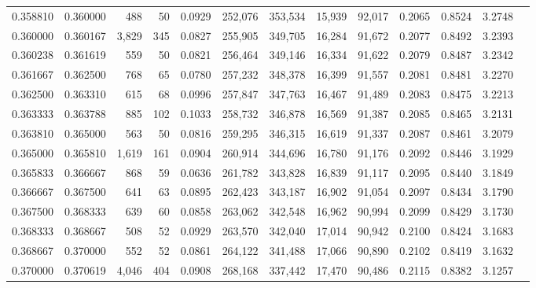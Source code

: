 \begin{tabular}{rrrrrrrrrrrrr}
0.358810 & 0.360000 &   488 &  50 &                                     0.0929 & 252,076 & 353,534 &  15,939 &  92,017 & 0.2065 & 0.8524 & 3.2748 \\
0.360000 & 0.360167 & 3,829 & 345 &                                     0.0827 & 255,905 & 349,705 &  16,284 &  91,672 & 0.2077 & 0.8492 & 3.2393 \\
0.360238 & 0.361619 &   559 &  50 &                                     0.0821 & 256,464 & 349,146 &  16,334 &  91,622 & 0.2079 & 0.8487 & 3.2342 \\
0.361667 & 0.362500 &   768 &  65 &                                     0.0780 & 257,232 & 348,378 &  16,399 &  91,557 & 0.2081 & 0.8481 & 3.2270 \\
0.362500 & 0.363310 &   615 &  68 &                                     0.0996 & 257,847 & 347,763 &  16,467 &  91,489 & 0.2083 & 0.8475 & 3.2213 \\
0.363333 & 0.363788 &   885 & 102 &                                     0.1033 & 258,732 & 346,878 &  16,569 &  91,387 & 0.2085 & 0.8465 & 3.2131 \\
0.363810 & 0.365000 &   563 &  50 &                                     0.0816 & 259,295 & 346,315 &  16,619 &  91,337 & 0.2087 & 0.8461 & 3.2079 \\
0.365000 & 0.365810 & 1,619 & 161 &                                     0.0904 & 260,914 & 344,696 &  16,780 &  91,176 & 0.2092 & 0.8446 & 3.1929 \\
0.365833 & 0.366667 &   868 &  59 &                                     0.0636 & 261,782 & 343,828 &  16,839 &  91,117 & 0.2095 & 0.8440 & 3.1849 \\
0.366667 & 0.367500 &   641 &  63 &                                     0.0895 & 262,423 & 343,187 &  16,902 &  91,054 & 0.2097 & 0.8434 & 3.1790 \\
0.367500 & 0.368333 &   639 &  60 &                                     0.0858 & 263,062 & 342,548 &  16,962 &  90,994 & 0.2099 & 0.8429 & 3.1730 \\
0.368333 & 0.368667 &   508 &  52 &                                     0.0929 & 263,570 & 342,040 &  17,014 &  90,942 & 0.2100 & 0.8424 & 3.1683 \\
0.368667 & 0.370000 &   552 &  52 &                                     0.0861 & 264,122 & 341,488 &  17,066 &  90,890 & 0.2102 & 0.8419 & 3.1632 \\
0.370000 & 0.370619 & 4,046 & 404 &                                     0.0908 & 268,168 & 337,442 &  17,470 &  90,486 & 0.2115 & 0.8382 & 3.1257 \\

\end{tabular}
